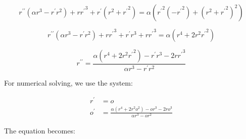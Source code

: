 \documentclass[12pt, a4paper]{report}
\begin{document}
\begin{equation}
r^{\prime\prime}\left(\alpha r^3 - r^{\prime}r^2\right) + r{r^\prime}^3 + r^\prime(r^2 + {r^\prime}^2) =
\alpha \left({r^\prime}^2 (- {r^\prime}^2) + (r^2+{r^\prime}^2)^2\right)
\end{equation}

\begin{equation}
r^{\prime\prime}\left(\alpha r^3 - r^{\prime}r^2\right) + r{r^\prime}^3 + r^\prime r^3 + r{r^\prime}^3 =
\alpha \left(r^4 + 2r^2 {r^\prime}^2\right)
\end{equation}

\begin{equation}
r^{\prime\prime} =
\frac{\alpha \left(r^4 + 2r^2 {r^\prime}^2\right) - r^\prime r^3 - 2r{r^\prime}^3 }{\alpha r^3 - r^{\prime}r^2} 
\end{equation}

For numerical solving, we use the system:

\begin {align}
r^\prime &= o \\
o^\prime &= \frac{\alpha \left(r^4 + 2r^2 o^2\right) - o r^3 - 2r o^3 }{\alpha r^3 - o r^2} 
\end{align}

The equation becomes:
\end{document}

